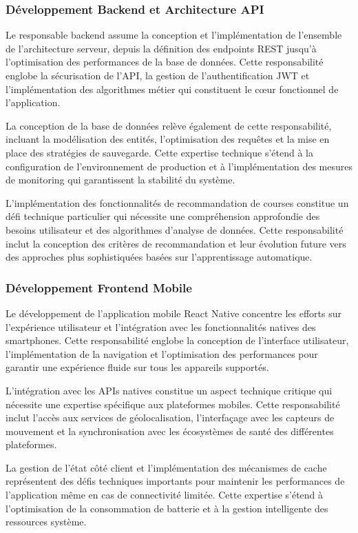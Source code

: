 \subsubsection{Développement Backend et Architecture API}

Le responsable backend assume la conception et l'implémentation de l'ensemble de l'architecture serveur, depuis la définition des endpoints REST jusqu'à l'optimisation des performances de la base de données. Cette responsabilité englobe la sécurisation de l'API, la gestion de l'authentification JWT et l'implémentation des algorithmes métier qui constituent le cœur fonctionnel de l'application.

La conception de la base de données relève également de cette responsabilité, incluant la modélisation des entités, l'optimisation des requêtes et la mise en place des stratégies de sauvegarde. Cette expertise technique s'étend à la configuration de l'environnement de production et à l'implémentation des mesures de monitoring qui garantissent la stabilité du système.

L'implémentation des fonctionnalités de recommandation de courses constitue un défi technique particulier qui nécessite une compréhension approfondie des besoins utilisateur et des algorithmes d'analyse de données. Cette responsabilité inclut la conception des critères de recommandation et leur évolution future vers des approches plus sophistiquées basées sur l'apprentissage automatique.

\subsubsection{Développement Frontend Mobile}

Le développement de l'application mobile React Native concentre les efforts sur l'expérience utilisateur et l'intégration avec les fonctionnalités natives des smartphones. Cette responsabilité englobe la conception de l'interface utilisateur, l'implémentation de la navigation et l'optimisation des performances pour garantir une expérience fluide sur tous les appareils supportés.

L'intégration avec les APIs natives constitue un aspect technique critique qui nécessite une expertise spécifique aux plateformes mobiles. Cette responsabilité inclut l'accès aux services de géolocalisation, l'interfaçage avec les capteurs de mouvement et la synchronisation avec les écosystèmes de santé des différentes plateformes.

La gestion de l'état côté client et l'implémentation des mécanismes de cache représentent des défis techniques importants pour maintenir les performances de l'application même en cas de connectivité limitée. Cette expertise s'étend à l'optimisation de la consommation de batterie et à la gestion intelligente des ressources système.

